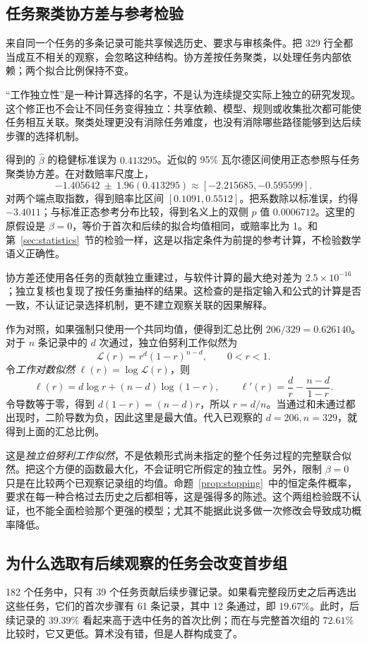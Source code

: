 \subsection{任务聚类协方差与参考检验}
\label{subsec:robust-covariance}
来自同一个任务的多条记录可能共享候选历史、要求与审核条件。把 329 行全都当成互不相关的观察，会忽略这种结构。协方差按任务聚类，以处理任务内部依赖；两个拟合比例保持不变。

“工作独立性”是一种计算选择的名字，不是认为连续提交实际上独立的研究发现。这个修正也不会让不同任务变得独立：共享依赖、模型、规则或收集批次都可能使任务相互关联。聚类处理更没有消除任务难度，也没有消除哪些路径能够到达后续步骤的选择机制。

得到的 $\widehat\beta$ 的稳健标准误为 $0.413295$。近似的 95\% 瓦尔德区间使用正态参照与任务聚类协方差。在对数赔率尺度上，
\[
-1.405642\ \pm\ 1.96(0.413295)
\approx[-2.215685,-0.595599].
\]
对两个端点取指数，得到赔率比区间 $[0.1091,0.5512]$。把系数除以标准误，约得 $-3.4011$；与标准正态参考分布比较，得到名义上的双侧 $p$ 值 $0.0006712$。这里的原假设是 $\beta=0$，等价于首次和后续的拟合均值相同，或赔率比为 1。和第~\ref{sec:statistics}~节的检验一样，这是以指定条件为前提的参考计算，不检验数学语义正确性。

协方差还使用各任务的贡献独立重建过，与软件计算的最大绝对差为 $2.5\times10^{-16}$；独立复核也复现了按任务重抽样的结果。这检查的是指定输入和公式的计算是否一致，不认证记录选择机制，更不建立观察关联的因果解释。

作为对照，如果强制只使用一个共同均值，便得到汇总比例 $206/329=0.626140$。对于 $n$ 条记录中的 $d$ 次通过，独立伯努利工作似然为
\[
 \mathcal L(r)=r^d(1-r)^{n-d},\qquad 0<r<1.
\]
令\emph{工作对数似然} $\ell(r)=\log\mathcal L(r)$，则
\[
 \ell(r)=d\log r+(n-d)\log(1-r),\qquad
 \ell'(r)=\frac d r-\frac{n-d}{1-r}.
\]
令导数等于零，得到 $d(1-r)=(n-d)r$，所以 $r=d/n$。当通过和未通过都出现时，二阶导数为负，因此这里是最大值。代入已观察的 $d=206,n=329$，就得到上面的汇总比例。

这是\emph{独立伯努利工作似然}，不是依赖形式尚未指定的整个任务过程的完整联合似然。把这个方便的函数最大化，不会证明它所假定的独立性。另外，限制 $\beta=0$ 只是在比较两个已观察记录组的均值。命题~\ref{prop:stopping}~中的恒定条件概率，要求在每一种合格过去历史之后都相等，这是强得多的陈述。这个两组检验既不认证，也不能全面检验那个更强的模型；尤其不能据此说多做一次修改会导致成功概率降低。

\subsection{为什么选取有后续观察的任务会改变首步组}
\label{subsec:later-selection}
182 个任务中，只有 39 个任务贡献后续步骤记录。如果看完整段历史之后再选出这些任务，它们的首次步骤有 61 条记录，其中 12 条通过，即 $19.67\%$。此时，后续记录的 $39.39\%$ 看起来高于选中任务的首次比例；而在与完整首次组的 $72.61\%$ 比较时，它又更低。算术没有错，但是人群构成变了。

